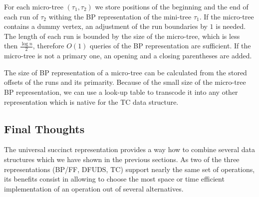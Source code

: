 For each micro-tree $(\tau_1, \tau_2)$ we store positions of the beginning and the end of each run of $\tau_2$ withing the BP representation of the mini-tree $\tau_1$.
If the micro-tree contains a dummy vertex, an adjustment of the run boundaries by $1$ is needed.
The length of each run is bounded by the size of the micro-tree, which is less then $\frac{\log n}{2}$, therefore $O(1)$ queries of the BP representation are sufficient.
If the micro-tree is not a primary one, an opening and a closing parentheses are added.

The size of BP representation of a micro-tree can be calculated from the stored offsets of the runs and its primarity.
Because of the small size of the micro-tree BP representation, we can use a look-up table to transcode it into any other representation which is native for the TC data structure.

\subsection{Final Thoughts}

The universal succinct representation provides a way how to combine several data structures which we have shown in the previous sections.
As two of the three representations (BP/FF, DFUDS, TC) support nearly the same set of operations, its benefits consist in allowing to choose the most space or time efficient implementation of an operation out of several alternatives.
